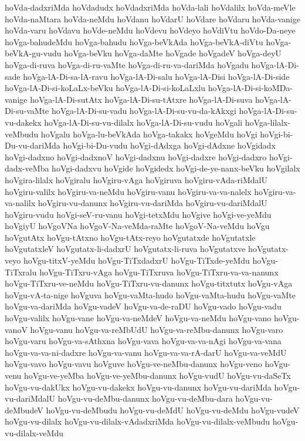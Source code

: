 {hoVda-dadxriMda
hoVdadudx
hoVdadxriMda
hoVda-lali
hoVdalilx
hoVda-meVle
hoVda-naMtara
hoVda-neMdu
hoVdanu
hoVdarU
hoVdare
hoVdaru
hoVda-vanige
hoVda-varu
hoVdavu
hoVde-neMdu
hoVdevu
hoVdeyo
hoVdiVtu
hoVdo-Da-neye
hoVga-bahudeMdu
hoVga-bahudu
hoVga-beVkAda
hoVga-beVkA-diVtu
hoVga-beVkA-gu-vudu
hoVga-beVku
hoVga-daMte
hoVgade
hoVgadeV
hoVga-deyU
hoVga-di-ruva
hoVga-di-ru-vaMte
hoVga-di-ru-va-dariMda
hoVgadu
hoVga-lA-Di-sade
hoVga-lA-Di-sa-lA-ravu
hoVga-lA-Di-salu
hoVga-lA-Disi
hoVga-lA-Di-side
hoVga-lA-Di-si-koLaLx-beVku
hoVga-lA-Di-si-koLaLxlu
hoVga-lA-Di-si-koMDa-vanige
hoVga-lA-Di-sutAtx
hoVga-lA-Di-su-tAtxre
hoVga-lA-Di-suva
hoVga-lA-Di-su-vaMte
hoVga-lA-Di-su-vadu
hoVga-lA-Di-su-vu-da-kAkxgi
hoVga-lA-Di-su-vu-dakekx
hoVga-lA-Di-su-vu-dilalx
hoVga-lA-Di-su-vudu
hoVgali
hoVga-lilalx-veMbudu
hoVgalu
hoVga-lu-beVkAda
hoVga-takakx
hoVgeMdu
hoVgi
hoVgi-bi-Du-vu-dariMda
hoVgi-bi-Du-vudu
hoVgi-dAdxga
hoVgi-dAdxne
hoVgidadx
hoVgi-dadxno
hoVgi-dadxnoV
hoVgi-dadxnu
hoVgi-dadxre
hoVgi-dadxro
hoVgi-dadx-veMba
hoVgi-dadxvu
hoVgide
hoVgidedx
hoVgi-de-ye-nanx-beVku
hoVgilalx
hoVgira-lilalx
hoVgiralu
hoVgiru-vAga
hoVgiruva
hoVgiru-vAda-riMdalU
hoVgiru-valilx
hoVgiru-va-neMdu
hoVgiru-vanu
hoVgiru-va-va-nalelx
hoVgiru-va-va-nalilx
hoVgiru-vu-danunx
hoVgiru-vu-dariMda
hoVgiru-vu-dariMdalU
hoVgiru-vudu
hoVgi-seV-ru-vanu
hoVgi-tetxMdu
hoVgive
hoVgi-ve-yeMdu
hoVgiyU
hoVgoVNa
hoVgoV-Na-veMda-raMte
hoVgoV-Na-veMdu
hoVgu
hoVgutAtx
hoVgu-tAtxno
hoVgu-tAtx-reyo
hoVgutatxde
hoVgutatxle
hoVgutatxleV
hoVgutatx-li-dadxrU
hoVgutatx-li-ruva
hoVgutatxve
hoVgutatx-veyo
hoVgu-titxV-yeMdu
hoVgu-TiTxdadxrU
hoVgu-TiTxde-yeMdu
hoVgu-TiTxralu
hoVgu-TiTxru-vAga
hoVgu-TiTxruva
hoVgu-TiTxru-va-va-nanunx
hoVgu-TiTxru-ve-neMdu
hoVgu-TiTxru-vu-danunx
hoVgu-titxtutx
hoVgu-vAga
hoVgu-vA-ta-nige
hoVguva
hoVgu-vaMta-hudo
hoVgu-vaMta-hudu
hoVgu-vaMte
hoVgu-va-dariMda
hoVgu-vadeV
hoVgu-va-de-raDU
hoVgu-vado
hoVgu-vadu
hoVgu-valilx
hoVgu-vane
hoVgu-va-neMdeV
hoVgu-va-neMdu
hoVgu-vano
hoVgu-vanoV
hoVgu-vanu
hoVgu-va-reMbUdU
hoVgu-va-reMbu-danunx
hoVgu-varo
hoVgu-varu
hoVgu-va-sAthxna
hoVgu-vava
hoVgu-va-va-nAgi
hoVgu-va-vana
hoVgu-va-va-ni-dadxre
hoVgu-va-vanu
hoVgu-va-va-rA-darU
hoVgu-va-veMdU
hoVgu-vavo
hoVgu-vavu
hoVguve
hoVgu-ve-neMbu-danunx
hoVgu-veno
hoVgu-venu
hoVgu-ve-yeMba
hoVgu-ve-yeMbu-danunx
hoVgu-vudU
hoVgu-vu-daSeTx
hoVgu-vu-dakUkx
hoVgu-vu-dakekx
hoVgu-vu-danunx
hoVgu-vu-dariMda
hoVgu-vu-dariMdalU
hoVgu-vu-deMbu-danunx
hoVgu-vu-deMbu-dara
hoVgu-vu-deMbudeV
hoVgu-vu-deMbudu
hoVgu-vu-deMdU
hoVgu-vu-deMdu
hoVgu-vudeV
hoVgu-vu-dilalx
hoVgu-vu-dilalx-vAdadxriMda
hoVgu-vu-dilalx-veMbudu
hoVgu-vu-dilalx-veMdu
}
